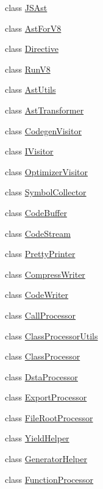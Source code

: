 \begin{DoxyCompactItemize}
class \hyperlink{classmocha_1_1_j_s_ast}{JSAst}
\item 
class \hyperlink{classmocha_1_1_ast_for_v8}{AstForV8}
\item 
class \hyperlink{classmocha_1_1_directive}{Directive}
\item 
class \hyperlink{classmocha_1_1_run_v8}{RunV8}
\item 
class \hyperlink{classmocha_1_1_ast_utils}{AstUtils}
\item 
class \hyperlink{classmocha_1_1_ast_transformer}{AstTransformer}
\item 
class \hyperlink{classmocha_1_1_codegen_visitor}{CodegenVisitor}
\item 
class \hyperlink{classmocha_1_1_i_visitor}{IVisitor}
\item 
class \hyperlink{classmocha_1_1_optimizer_visitor}{OptimizerVisitor}
\item 
class \hyperlink{classmocha_1_1_symbol_collector}{SymbolCollector}
\item 
class \hyperlink{classmocha_1_1_code_buffer}{CodeBuffer}
\item 
class \hyperlink{classmocha_1_1_code_stream}{CodeStream}
\item 
class \hyperlink{classmocha_1_1_pretty_printer}{PrettyPrinter}
\item 
class \hyperlink{classmocha_1_1_compress_writer}{CompressWriter}
\item 
class \hyperlink{classmocha_1_1_code_writer}{CodeWriter}
\item 
class \hyperlink{classmocha_1_1_call_processor}{CallProcessor}
\item 
class \hyperlink{classmocha_1_1_class_processor_utils}{ClassProcessorUtils}
\item 
class \hyperlink{classmocha_1_1_class_processor}{ClassProcessor}
\item 
class \hyperlink{classmocha_1_1_dsta_processor}{DstaProcessor}
\item 
class \hyperlink{classmocha_1_1_export_processor}{ExportProcessor}
\item 
class \hyperlink{classmocha_1_1_file_root_processor}{FileRootProcessor}
\item 
class \hyperlink{classmocha_1_1_yield_helper}{YieldHelper}
\item 
class \hyperlink{classmocha_1_1_generator_helper}{GeneratorHelper}
\item 
class \hyperlink{classmocha_1_1_function_processor}{FunctionProcessor}
\item 

\end{DoxyCompactItemize}
